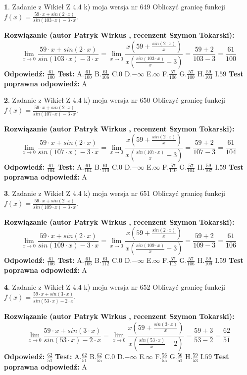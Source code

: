 \documentclass[12pt, a4paper]{article}
\theoremstyle{definition} %
\newtheorem{zad}{}
\newcommand{\zadStart}[1]{\begin{zad}#1\newline}
\newcommand{\zadStop}{\end{zad}}
\newcommand{\rozwStart}[2]{\noindent \textbf{Rozwiązanie (autor #1 , recenzent #2): }\newline}
\newcommand{\rozwStop}{\newline}
\newcommand{\odpStart}{\noindent \textbf{Odpowiedź:}\newline}
\newcommand{\odpStop}{\newline}
\newcommand{\testStart}{\noindent \textbf{Test:}\newline}
\newcommand{\testStop}{\newline}
\newcommand{\kluczStart}{\noindent \textbf{Test poprawna odpowiedź:}\newline}
\newcommand{\kluczStop}{\newline}
\begin{document}
\zadStart{Zadanie z Wikieł Z 4.4 k) moja wersja nr 649}
Obliczyć granicę funkcji $f(x)=\frac{59\cdot x +sin(2\cdot x)}{sin(103\cdot x) -3\cdot x}$.
\zadStop
\rozwStart{Patryk Wirkus}{Szymon Tokarski}
$$\lim\limits_{x\to 0}\frac{59\cdot x +sin(2\cdot x)}{sin(103\cdot x) -3\cdot x}
=\lim\limits_{x\to 0}\frac{x(59+\frac{sin(2\cdot x)}{x})}{x(\frac{sin(103\cdot x)}{x}-3)}
=\frac{59+2}{103-3} = \frac{61}{100}$$
\rozwStop
\odpStart
$\frac{61}{100}$
\odpStop
\testStart
A.$\frac{61}{100}$
B.$\frac{61}{106}$
C.$0$
D.$-\infty$
E.$\infty$
F.$\frac{57}{106}$
G.$\frac{57}{100}$
H.$\frac{59}{103}$
I.$59$
\testStop
\kluczStart
A
\kluczStop



\zadStart{Zadanie z Wikieł Z 4.4 k) moja wersja nr 650}
Obliczyć granicę funkcji $f(x)=\frac{59\cdot x +sin(2\cdot x)}{sin(107\cdot x) -3\cdot x}$.
\zadStop
\rozwStart{Patryk Wirkus}{Szymon Tokarski}
$$\lim\limits_{x\to 0}\frac{59\cdot x +sin(2\cdot x)}{sin(107\cdot x) -3\cdot x}
=\lim\limits_{x\to 0}\frac{x(59+\frac{sin(2\cdot x)}{x})}{x(\frac{sin(107\cdot x)}{x}-3)}
=\frac{59+2}{107-3} = \frac{61}{104}$$
\rozwStop
\odpStart
$\frac{61}{104}$
\odpStop
\testStart
A.$\frac{61}{104}$
B.$\frac{61}{110}$
C.$0$
D.$-\infty$
E.$\infty$
F.$\frac{57}{110}$
G.$\frac{57}{104}$
H.$\frac{59}{107}$
I.$59$
\testStop
\kluczStart
A
\kluczStop



\zadStart{Zadanie z Wikieł Z 4.4 k) moja wersja nr 651}
Obliczyć granicę funkcji $f(x)=\frac{59\cdot x +sin(2\cdot x)}{sin(109\cdot x) -3\cdot x}$.
\zadStop
\rozwStart{Patryk Wirkus}{Szymon Tokarski}
$$\lim\limits_{x\to 0}\frac{59\cdot x +sin(2\cdot x)}{sin(109\cdot x) -3\cdot x}
=\lim\limits_{x\to 0}\frac{x(59+\frac{sin(2\cdot x)}{x})}{x(\frac{sin(109\cdot x)}{x}-3)}
=\frac{59+2}{109-3} = \frac{61}{106}$$
\rozwStop
\odpStart
$\frac{61}{106}$
\odpStop
\testStart
A.$\frac{61}{106}$
B.$\frac{61}{112}$
C.$0$
D.$-\infty$
E.$\infty$
F.$\frac{57}{112}$
G.$\frac{57}{106}$
H.$\frac{59}{109}$
I.$59$
\testStop
\kluczStart
A
\kluczStop



\zadStart{Zadanie z Wikieł Z 4.4 k) moja wersja nr 652}
Obliczyć granicę funkcji $f(x)=\frac{59\cdot x +sin(3\cdot x)}{sin(53\cdot x) -2\cdot x}$.
\zadStop
\rozwStart{Patryk Wirkus}{Szymon Tokarski}
$$\lim\limits_{x\to 0}\frac{59\cdot x +sin(3\cdot x)}{sin(53\cdot x) -2\cdot x}
=\lim\limits_{x\to 0}\frac{x(59+\frac{sin(3\cdot x)}{x})}{x(\frac{sin(53\cdot x)}{x}-2)}
=\frac{59+3}{53-2} = \frac{62}{51}$$
\rozwStop
\odpStart
$\frac{62}{51}$
\odpStop
\testStart
A.$\frac{62}{51}$
B.$\frac{62}{55}$
C.$0$
D.$-\infty$
E.$\infty$
F.$\frac{56}{55}$
G.$\frac{56}{51}$
H.$\frac{59}{53}$
I.$59$
\testStop
\kluczStart
A
\kluczStop
\end{document}
